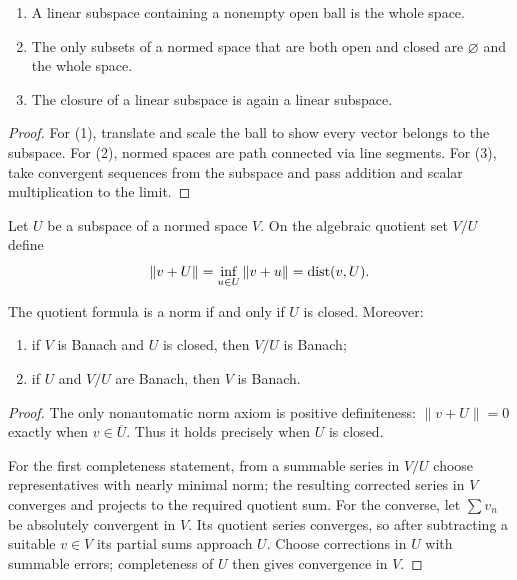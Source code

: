 \begin{noteexercise}
\begin{enumerate}
  \item A linear subspace containing a nonempty open ball is the whole space.
  \item The only subsets of a normed space that are both open and closed are
        $\varnothing$ and the whole space.
  \item The closure of a linear subspace is again a linear subspace.
\end{enumerate}
\end{noteexercise}

\begin{proof}
For (1), translate and scale the ball to show every vector belongs to the
subspace.  For (2), normed spaces are path connected via line segments.
For (3), take convergent sequences from the subspace and pass addition and
scalar multiplication to the limit.
\end{proof}

\begin{notedefinition}
Let $U$ be a subspace of a normed space $V$.  On the algebraic quotient set
$V/U$ define
\[
  \|v+U\|=\inf_{u\in U}\|v+u\|=\operatorname{dist}(v,U).
\]
\end{notedefinition}

\begin{notetheorem}
The quotient formula is a norm if and only if $U$ is closed.  Moreover:
\begin{enumerate}
  \item if $V$ is Banach and $U$ is closed, then $V/U$ is Banach;
  \item if $U$ and $V/U$ are Banach, then $V$ is Banach.
\end{enumerate}
\end{notetheorem}

\begin{proof}
The only nonautomatic norm axiom is positive definiteness:
$\|v+U\|=0$ exactly when $v\in\overline U$.  Thus it holds precisely when
$U$ is closed.

For the first completeness statement, from a summable series in $V/U$ choose
representatives with nearly minimal norm; the resulting corrected series in
$V$ converges and projects to the required quotient sum.  For the converse,
let $\sum v_n$ be absolutely convergent in $V$.  Its quotient series
converges, so after subtracting a suitable $v\in V$ its partial sums approach
$U$.  Choose corrections in $U$ with summable errors; completeness of $U$
then gives convergence in $V$.
\end{proof}

